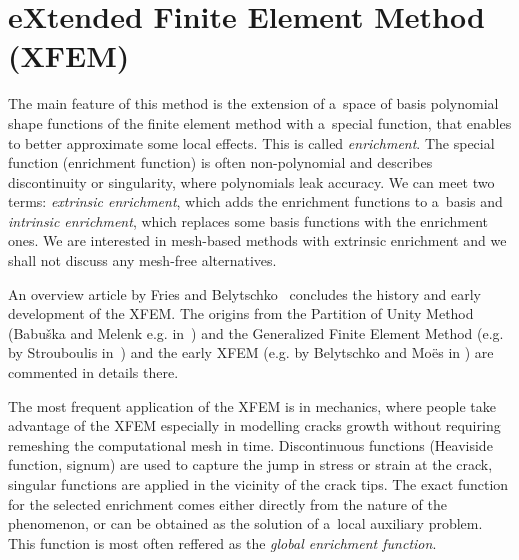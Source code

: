 


\section{eXtended Finite Element Method (XFEM)} \label{sec:soa_xfem}

The main feature of this method is the extension of a~space of basis polynomial shape functions of the finite element
method with a~special function, that enables to better approximate some local effects. This is called \emph{enrichment}.
The special function (enrichment function) is often non-polynomial and describes discontinuity or singularity,
where polynomials leak accuracy. We can meet two terms: \emph{extrinsic enrichment}, which adds the enrichment
functions to a~basis and \emph{intrinsic enrichment}, which replaces some basis functions with the enrichment ones.
We are interested in mesh-based methods with extrinsic enrichment and we shall not discuss any mesh-free alternatives.

An overview article by Fries and Belytschko~\cite{fries_xfem_overview_2010} concludes the history and early development
of the XFEM. The origins from the Partition of Unity Method (Babu{\v s}ka and Melenk e.g. in~\cite{babuska_partition_1997}) and
the Generalized Finite Element Method (e.g. by Strouboulis in~\cite{strouboulis_generalized_2000}) 
and the early XFEM (e.g. by Belytschko and Mo{\"e}s in \cite{moes_finite_1999}) are commented in details there.

The most frequent application of the XFEM is in mechanics, where people take advantage of the XFEM especially in
modelling cracks growth without requiring remeshing the computational mesh in time. 
Discontinuous functions (Heaviside function, signum) are used to capture the jump in stress or strain at the crack,
singular functions are applied in the vicinity of the crack tips. The exact function for the selected enrichment
comes either directly from the nature of the phenomenon, or can be obtained as the solution of a~local auxiliary
problem. This function is most often reffered as the \emph{global enrichment function}.

